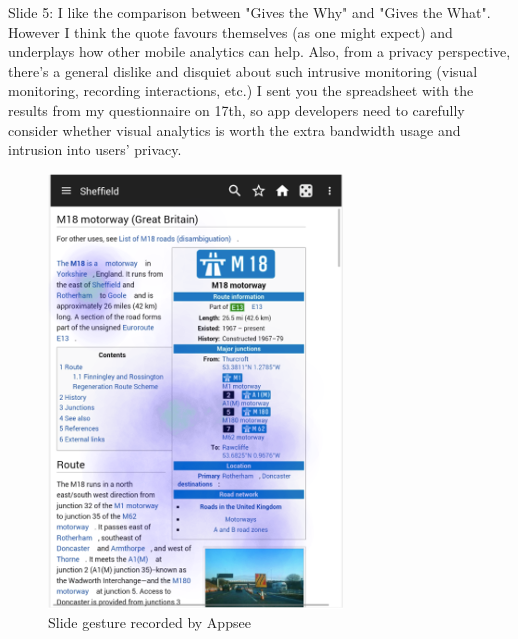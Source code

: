 Slide 5: I like the comparison between "Gives the Why" and "Gives the What". However I think the quote favours themselves (as one might expect) and underplays how other mobile analytics can help. Also, from a privacy perspective, there's a general dislike and disquiet about such intrusive monitoring (visual monitoring, recording interactions, etc.) I sent you the spreadsheet with the results from my questionnaire on 17th, so app developers need to carefully consider whether visual analytics is worth the extra bandwidth usage and intrusion into users' privacy. 

\begin{figure}
    \centering
      \begin{minipage}[b]{0.4\textwidth}
        \includegraphics[width=\textwidth]{images/my/kiwix-appsee-slide.png}
        \caption{Slide gesture recorded by Appsee}

\end{minipage}
\end{figure}
